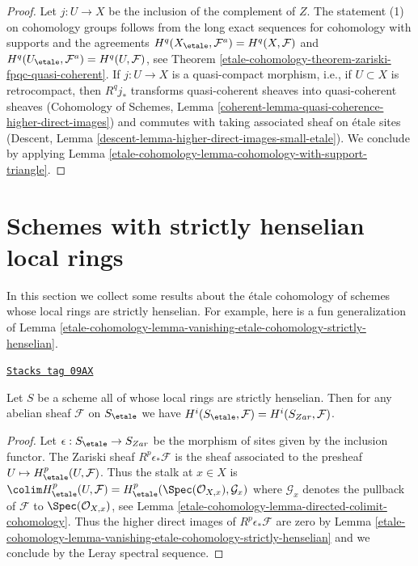 \begin{proof}
Let $j : U \to X$ be the inclusion of the complement of $Z$.
The statement (1) on cohomology groups follows from the long
exact sequences for cohomology with supports and the agreements
$H^q(X_\etale, \mathcal{F}^a) = H^q(X, \mathcal{F})$ and
$H^q(U_\etale, \mathcal{F}^a) = H^q(U, \mathcal{F})$, see
Theorem \ref{etale-cohomology-theorem-zariski-fpqc-quasi-coherent}.
If $j : U \to X$ is a quasi-compact morphism, i.e., if $U \subset X$
is retrocompact, then $R^qj_*$ transforms quasi-coherent sheaves
into quasi-coherent sheaves
(Cohomology of Schemes, Lemma
\ref{coherent-lemma-quasi-coherence-higher-direct-images})
and commutes with taking associated
sheaf on \'etale sites
(Descent, Lemma \ref{descent-lemma-higher-direct-images-small-etale}).
We conclude by applying
Lemma \ref{etale-cohomology-lemma-cohomology-with-support-triangle}.
\end{proof}

\section{Schemes with strictly henselian local rings}
\label{etale-cohomology-section-strictly-henselian-local-rings}
In this section we collect some results about the \'etale cohomology
of schemes whose local rings are strictly henselian. For example,
here is a fun generalization of
Lemma \ref{etale-cohomology-lemma-vanishing-etale-cohomology-strictly-henselian}.

\begin{lemma}
\label{etale-cohomology-lemma-local-rings-strictly-henselian}
\href{https://stacks.math.columbia.edu/tag/09AX}{\texttt{Stacks tag 09AX}}

Let $S$ be a scheme all of whose local rings are strictly henselian.
Then for any abelian sheaf $\mathcal{F}$ on $S_\etale$ we have
$H^i(S_\etale, \mathcal{F}) = H^i(S_{Zar}, \mathcal{F})$.
\end{lemma}

\begin{proof}
Let $\epsilon : S_\etale \to S_{Zar}$ be the morphism of sites given
by the inclusion functor. The Zariski sheaf $R^p\epsilon_*\mathcal{F}$
is the sheaf associated to the presheaf $U \mapsto H^p_\etale(U, \mathcal{F})$.
Thus the stalk at $x \in X$ is
$\colim H^p_\etale(U, \mathcal{F}) =
H^p_\etale(\Spec(\mathcal{O}_{X, x}), \mathcal{G}_x)$
where $\mathcal{G}_x$ denotes the pullback of $\mathcal{F}$
to $\Spec(\mathcal{O}_{X, x})$, see
Lemma \ref{etale-cohomology-lemma-directed-colimit-cohomology}.
Thus the higher direct images of $R^p\epsilon_*\mathcal{F}$ are
zero by
Lemma \ref{etale-cohomology-lemma-vanishing-etale-cohomology-strictly-henselian}
and we conclude by the Leray spectral sequence.
\end{proof}


